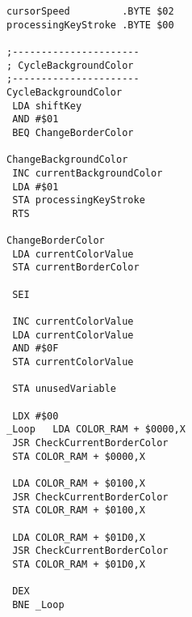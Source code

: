 \begin{minipage}[b]{0.33\linewidth}
\begin{lrbox}{\mybox}
\begin{lstlisting}[basicstyle=\ttfamily\tiny]
cursorSpeed         .BYTE $02
processingKeyStroke .BYTE $00

;----------------------
; CycleBackgroundColor   
;----------------------
CycleBackgroundColor   
 LDA shiftKey 
 AND #$01
 BEQ ChangeBorderColor

ChangeBackgroundColor
 INC currentBackgroundColor
 LDA #$01
 STA processingKeyStroke 
 RTS 

ChangeBorderColor
 LDA currentColorValue
 STA currentBorderColor

 SEI 

 INC currentColorValue
 LDA currentColorValue
 AND #$0F
 STA currentColorValue

 STA unusedVariable

 LDX #$00
_Loop   LDA COLOR_RAM + $0000,X
 JSR CheckCurrentBorderColor
 STA COLOR_RAM + $0000,X

 LDA COLOR_RAM + $0100,X
 JSR CheckCurrentBorderColor
 STA COLOR_RAM + $0100,X

 LDA COLOR_RAM + $01D0,X
 JSR CheckCurrentBorderColor
 STA COLOR_RAM + $01D0,X

 DEX 
 BNE _Loop
\end{lstlisting}
\end{lrbox}%
\scalebox{0.8}{\usebox{\mybox}}
\end{minipage}
\hspace{0.5cm}
